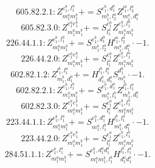 \documentclass[letterpaper,10pt,fleqn,leqno,onecolumn]{article}
\begin{document}
\begin{equation} \;\;\;\;\;\;  605.82.2.1: Z^{e_{1}^{b},l_{1}^{a}}_{m_{1}^{a}m_{1}^{b}}+=S^{e_{1}^{b},d_{1}^{a}}_{m_{1}^{b},l_{2}^{a}}Z^{l_{1}^{a},l_{2}^{a}}_{m_{1}^{a},d_{1}^{a}} \end{equation}
\begin{equation} \;\;\;\;\;\;  605.82.3.0: Z^{e_{1}^{a}e_{1}^{b}}_{m_{1}^{a}m_{1}^{b}}+=S^{e_{1}^{a}}_{l_{1}^{a}}Z^{e_{1}^{b},l_{1}^{a}}_{m_{1}^{a}m_{1}^{b}} \end{equation}
\begin{equation} \;\;\;\;\;\;  226.44.1.1: Z^{e_{1}^{b},l_{1}^{a}}_{m_{1}^{a}m_{1}^{b}}+=S^{e_{1}^{b},d_{1}^{a}}_{m_{1}^{b},l_{2}^{a}}H^{l_{1}^{a},l_{2}^{a}}_{m_{1}^{a},d_{1}^{a}}\cdot -1. \end{equation}
\begin{equation} \;\;\;\;\;\;  226.44.2.0: Z^{e_{1}^{a}e_{1}^{b}}_{m_{1}^{a}m_{1}^{b}}+=S^{e_{1}^{a}}_{l_{1}^{a}}Z^{e_{1}^{b},l_{1}^{a}}_{m_{1}^{a}m_{1}^{b}} \end{equation}
\begin{equation} \;\;\;\;\;\;  602.82.1.2: Z^{l_{1}^{b},l_{1}^{a}}_{m_{1}^{b},d_{1}^{a}}+=H^{l_{1}^{b},l_{1}^{a}}_{d_{1}^{b},d_{1}^{a}}S^{d_{1}^{b}}_{m_{1}^{b}}\cdot -1. \end{equation}
\begin{equation} \;\;\;\;\;\;  602.82.2.1: Z^{e_{1}^{b},l_{1}^{a}}_{m_{1}^{a}m_{1}^{b}}+=S^{e_{1}^{b},d_{1}^{a}}_{m_{1}^{a},l_{1}^{b}}Z^{l_{1}^{b},l_{1}^{a}}_{m_{1}^{b},d_{1}^{a}} \end{equation}
\begin{equation} \;\;\;\;\;\;  602.82.3.0: Z^{e_{1}^{a}e_{1}^{b}}_{m_{1}^{a}m_{1}^{b}}+=S^{e_{1}^{a}}_{l_{1}^{a}}Z^{e_{1}^{b},l_{1}^{a}}_{m_{1}^{a}m_{1}^{b}} \end{equation}
\begin{equation} \;\;\;\;\;\;  223.44.1.1: Z^{e_{1}^{b},l_{1}^{a}}_{m_{1}^{a}m_{1}^{b}}+=S^{e_{1}^{b},d_{1}^{a}}_{m_{1}^{a},l_{1}^{b}}H^{l_{1}^{b},l_{1}^{a}}_{m_{1}^{b},d_{1}^{a}}\cdot -1. \end{equation}
\begin{equation} \;\;\;\;\;\;  223.44.2.0: Z^{e_{1}^{a}e_{1}^{b}}_{m_{1}^{a}m_{1}^{b}}+=S^{e_{1}^{a}}_{l_{1}^{a}}Z^{e_{1}^{b},l_{1}^{a}}_{m_{1}^{a}m_{1}^{b}} \end{equation}
\begin{equation} \;\;\;\;\;\;  284.51.1.1: Z^{e_{1}^{b},l_{1}^{a}}_{m_{1}^{a}m_{1}^{b}}+=S^{e_{1}^{b},d_{1}^{a}d_{1}^{b}}_{m_{1}^{a}m_{1}^{b},l_{1}^{b}}H^{l_{1}^{b},l_{1}^{a}}_{d_{1}^{a}d_{1}^{b}}\cdot -1. \end{equation}
\end{document}
